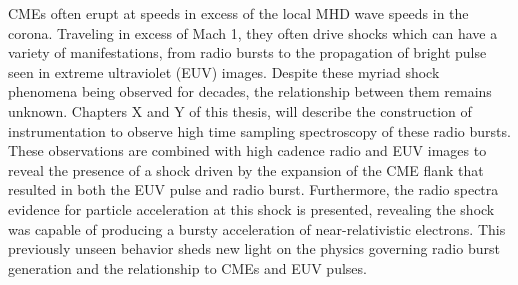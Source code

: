 \begin{abstracts}
CMEs often erupt at speeds in excess of the local MHD wave speeds in the corona. Traveling in excess of Mach 1, they often drive shocks which can have a variety of manifestations, from radio bursts to the propagation of bright pulse seen in extreme ultraviolet (EUV) images. Despite these myriad shock phenomena being observed for decades, the relationship between them remains unknown. Chapters X and Y of this thesis, will describe the construction of instrumentation to observe high time sampling spectroscopy of these radio bursts. These observations are combined with high cadence radio and EUV images to reveal the presence of a shock driven by the expansion of the CME flank that resulted in both the EUV pulse and radio burst. Furthermore, the radio spectra evidence for particle acceleration at this shock is presented, revealing the shock was capable of producing a bursty acceleration of near-relativistic electrons. This previously unseen behavior sheds new light on the physics governing radio burst generation and the relationship to CMEs and EUV pulses.

\end{abstracts}

